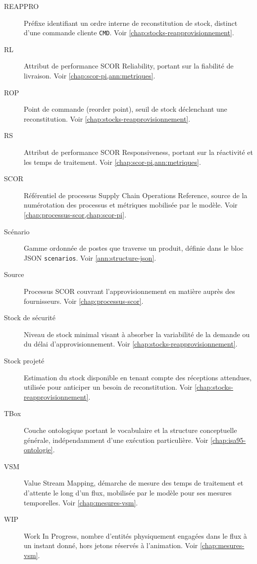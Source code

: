 \begin{description}
\item[REAPPRO] Préfixe identifiant un ordre interne de reconstitution de stock, distinct d'une commande cliente \texttt{CMD}. Voir \cref{chap:stocks-reapprovisionnement}.

\item[RL] Attribut de performance SCOR Reliability, portant sur la fiabilité de livraison. Voir \cref{chap:scor-pi,ann:metriques}.

\item[ROP] Point de commande (reorder point), seuil de stock déclenchant une reconstitution. Voir \cref{chap:stocks-reapprovisionnement}.

\item[RS] Attribut de performance SCOR Responsiveness, portant sur la réactivité et les temps de traitement. Voir \cref{chap:scor-pi,ann:metriques}.

\item[SCOR] Référentiel de processus Supply Chain Operations Reference, source de la numérotation des processus et métriques mobilisée par le modèle. Voir \cref{chap:processus-scor,chap:scor-pi}.

\item[Scénario] Gamme ordonnée de postes que traverse un produit, définie dans le bloc JSON \texttt{scenarios}. Voir \cref{ann:structure-json}.

\item[Source] Processus SCOR couvrant l'approvisionnement en matière auprès des fournisseurs. Voir \cref{chap:processus-scor}.

\item[Stock de sécurité] Niveau de stock minimal visant à absorber la variabilité de la demande ou du délai d'approvisionnement. Voir \cref{chap:stocks-reapprovisionnement}.

\item[Stock projeté] Estimation du stock disponible en tenant compte des réceptions attendues, utilisée pour anticiper un besoin de reconstitution. Voir \cref{chap:stocks-reapprovisionnement}.

\item[TBox] Couche ontologique portant le vocabulaire et la structure conceptuelle générale, indépendamment d'une exécution particulière. Voir \cref{chap:isa95-ontologie}.

\item[VSM] Value Stream Mapping, démarche de mesure des temps de traitement et d'attente le long d'un flux, mobilisée par le modèle pour ses mesures temporelles. Voir \cref{chap:mesures-vsm}.

\item[WIP] Work In Progress, nombre d'entités physiquement engagées dans le flux à un instant donné, hors jetons réservés à l'animation. Voir \cref{chap:mesures-vsm}.

\end{description}
